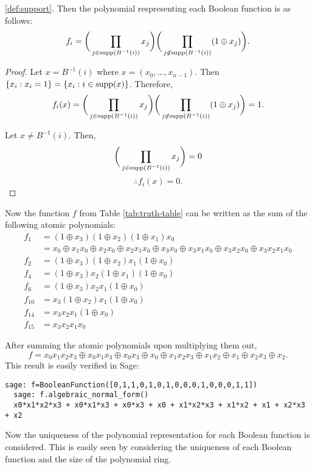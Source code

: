 \documentclass[english]{article}
\theoremstyle{plain}
\theoremstyle{definition}
\theoremstyle{remark}
\begin{document}
\ref{def:support}. Then the polynomial respresenting each Boolean function
is as follows:
\begin{equation}\label{eqn:atomic-ANF}
  f_i=\bigg(\prod_{j\in {\rm supp}(B^{-1}(i))}x_j\bigg)
    \bigg(\prod_{j\not\in {\rm supp}(B^{-1}(i))}(1\oplus x_j)\bigg).
\end{equation}
\begin{proof}
  Let $x=B^{-1}(i)$ where $x=(x_0,\dots,x_{n-1})$. Then
  $\{x_i:x_i=1\}=\{x_i:i\in {\rm supp}(x)\}$. Therefore,
  \[
  f_i(x)=\bigg(\prod_{j\in {\rm supp}(B^{-1}(i))}x_j\bigg)
    \bigg(\prod_{j\not\in {\rm supp}(B^{-1}(i))}(1\oplus x_j)\bigg)=1.
  \]

  Let $x\not=B^{-1}(i)$. Then,
  \[
  \bigg(\prod_{j\in {\rm supp}(B^{-1}(i))}x_j\bigg)=0
  \]\[
  \therefore f_i(x)=0.
  \]
\end{proof}

\par Now the function $f$ from Table \ref{tab:truth-table} can be written as
the sum of the following atomic polynomials:
\begin{align*}
  f_1   &=(1\oplus x_3)(1\oplus x_2)(1\oplus x_1)x_0\\
        &=x_0 \oplus x_1x_0 \oplus x_2x_0 \oplus x_2x_1x_0 \oplus
          x_3x_0 \oplus x_3x_1x_0 \oplus x_3x_2x_0 \oplus x_3x_2x_1x_0\\
  f_2   &=(1\oplus x_3)(1\oplus x_2)x_1(1\oplus x_0)\\
  f_4   &=(1\oplus x_3)x_2(1\oplus x_1)(1\oplus x_0)\\
  f_6   &=(1\oplus x_3)x_2x_1(1\oplus x_0)\\
  f_{10}&=x_3(1\oplus x_2)x_1(1\oplus x_0)\\
  f_{14}&=x_3x_2x_1(1\oplus x_0)\\
  f_{15}&=x_3x_2x_1x_0
\end{align*}
\par After summing the atomic polynomials upon multiplying them out,
\[
  f=x_0x_1x_2x_3\oplus x_0x_1x_3 \oplus x_0x_3 \oplus x_0 \oplus x_1x_2x_3
    \oplus x_1x_2\oplus x_1\oplus x_2x_3 \oplus x_2.
\]
This result is easily verified in Sage:
\begin{lstlisting}[gobble=1]
  sage: f=BooleanFunction([0,1,1,0,1,0,1,0,0,0,1,0,0,0,1,1])
  sage: f.algebraic_normal_form()
  x0*x1*x2*x3 + x0*x1*x3 + x0*x3 + x0 + x1*x2*x3 + x1*x2 + x1 + x2*x3 + x2
\end{lstlisting}

\par Now the uniqueness of the polynomial representation for each Boolean
function is considered. This is easily seen by considering the uniqueness of
each Boolean function and the size of the polynomial ring.
\end{document}
